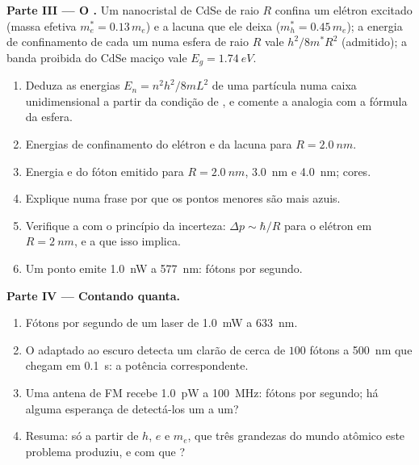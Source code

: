 \begin{problem}
\medskip
\noindent\textbf{Parte III --- O .}
Um nanocristal de CdSe de raio $R$ confina um elétron excitado
(massa efetiva $m_e^\ast = 0.13\,m_e$) e a lacuna que ele deixa
($m_h^\ast = 0.45\,m_e$); a energia de confinamento de cada um numa esfera de
raio $R$ vale $h^2/8m^\ast R^2$ (admitido); a banda proibida do CdSe maciço vale
$E_g = \qty{1.74}{eV}$.
\begin{enumerate}[resume]
  \item Deduza as energias $E_n = n^2h^2/8mL^2$ de uma partícula numa
        caixa unidimensional a partir da condição de , e
        comente a analogia com a fórmula da esfera.
  \item Energias de confinamento do elétron e da lacuna para
        $R = \qty{2.0}{nm}$.
  \item Energia e  do fóton emitido para $R = \qty{2.0}{nm}$,
        \qty{3.0}{nm} e \qty{4.0}{nm}; cores.
  \item Explique numa frase por que os pontos menores são mais azuis.
  \item Verifique a  com o princípio da incerteza:
        $\Delta p \sim \hbar/R$ para o elétron em $R = \qty{2}{nm}$, e a
         que isso implica.
  \item Um ponto emite \qty{1.0}{nW} a \qty{577}{nm}: fótons por segundo.
\end{enumerate}

\medskip
\noindent\textbf{Parte IV --- Contando quanta.}
\begin{enumerate}[resume]
  \item Fótons por segundo de um laser de \qty{1.0}{mW} a \qty{633}{nm}.
  \item O  adaptado ao escuro detecta um clarão de cerca de $100$ fótons a
        \qty{500}{nm} que chegam em \qty{0.1}{s}: a potência correspondente.
  \item Uma antena de FM recebe \qty{1.0}{pW} a \qty{100}{MHz}: fótons por
        segundo; há alguma esperança de detectá-los um a um?
  \item Resuma: só a partir de $h$, $e$ e $m_e$, que três grandezas do
        mundo atômico este problema produziu, e com que
        ?
\end{enumerate}
\end{problem}
